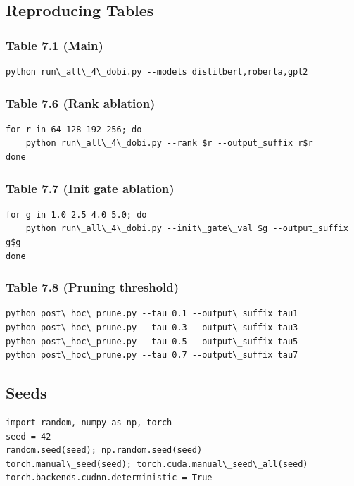\subsection{Reproducing Tables}

\subsubsection{Table 7.1 (Main)}
\begin{lstlisting}
python run\_all\_4\_dobi.py --models distilbert,roberta,gpt2
\end{lstlisting}

\subsubsection{Table 7.6 (Rank ablation)}
\begin{lstlisting}
for r in 64 128 192 256; do
    python run\_all\_4\_dobi.py --rank $r --output_suffix r$r
done
\end{lstlisting}

\subsubsection{Table 7.7 (Init gate ablation)}
\begin{lstlisting}
for g in 1.0 2.5 4.0 5.0; do
    python run\_all\_4\_dobi.py --init\_gate\_val $g --output_suffix g$g
done
\end{lstlisting}

\subsubsection{Table 7.8 (Pruning threshold)}
\begin{lstlisting}
python post\_hoc\_prune.py --tau 0.1 --output\_suffix tau1
python post\_hoc\_prune.py --tau 0.3 --output\_suffix tau3
python post\_hoc\_prune.py --tau 0.5 --output\_suffix tau5
python post\_hoc\_prune.py --tau 0.7 --output\_suffix tau7
\end{lstlisting}

\subsection{Seeds}

\begin{lstlisting}
import random, numpy as np, torch
seed = 42
random.seed(seed); np.random.seed(seed)
torch.manual\_seed(seed); torch.cuda.manual\_seed\_all(seed)
torch.backends.cudnn.deterministic = True
\end{lstlisting}

